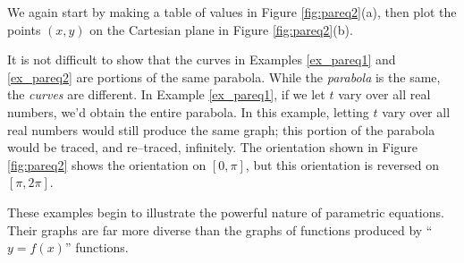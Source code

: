 {We again start by making a table of values in Figure \ref{fig:pareq2}(a), then plot the points $(x,y)$ on the Cartesian plane in Figure \ref{fig:pareq2}(b).

It is not difficult to show that the curves in Examples \ref{ex_pareq1} and \ref{ex_pareq2} are portions of the same parabola. While the \textit{parabola} is the same, the \textit{curves} are different. In Example \ref{ex_pareq1}, if we let $t$ vary over all real numbers, we'd obtain the entire parabola. In this example, letting $t$ vary over all real numbers would still produce the same graph; this portion of the parabola would be traced, and re--traced, infinitely. The orientation shown in Figure \ref{fig:pareq2} shows the orientation on $[0,\pi]$, but this orientation is reversed on $[\pi,2\pi]$.

These examples begin to illustrate the powerful nature of parametric equations. Their graphs are far more diverse than the graphs of functions produced by ``$y=f(x)$'' functions.
}\\

